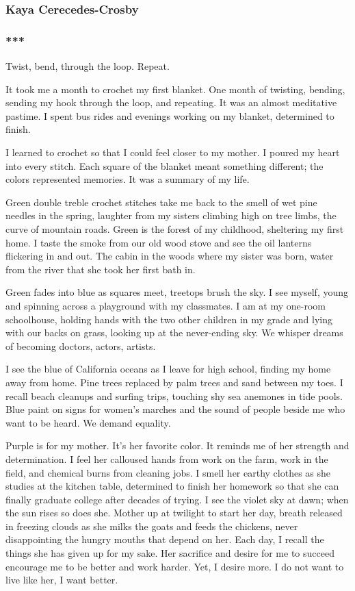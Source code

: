 \hypertarget{kaya-cerecedes-crosby}{%
\subsubsection{Kaya Cerecedes-Crosby}\label{kaya-cerecedes-crosby}}

\hypertarget{-3}{%
\subsubsection{***}\label{-3}}

Twist, bend, through the loop. Repeat.

It took me a month to crochet my first blanket. One month of twisting,
bending, sending my hook through the loop, and repeating. It was an
almost meditative pastime. I spent bus rides and evenings working on my
blanket, determined to finish.

I learned to crochet so that I could feel closer to my mother. I poured
my heart into every stitch. Each square of the blanket meant something
different; the colors represented memories. It was a summary of my life.

Green double treble crochet stitches take me back to the smell of wet
pine needles in the spring, laughter from my sisters climbing high on
tree limbs, the curve of mountain roads. Green is the forest of my
childhood, sheltering my first home. I taste the smoke from our old wood
stove and see the oil lanterns flickering in and out. The cabin in the
woods where my sister was born, water from the river that she took her
first bath in.

Green fades into blue as squares meet, treetops brush the sky. I see
myself, young and spinning across a playground with my classmates. I am
at my one-room schoolhouse, holding hands with the two other children in
my grade and lying with our backs on grass, looking up at the
never-ending sky. We whisper dreams of becoming doctors, actors,
artists.

I see the blue of California oceans as I leave for high school, finding
my home away from home. Pine trees replaced by palm trees and sand
between my toes. I recall beach cleanups and surfing trips, touching shy
sea anemones in tide pools. Blue paint on signs for women's marches and
the sound of people beside me who want to be heard. We demand equality.

Purple is for my mother. It's her favorite color. It reminds me of her
strength and determination. I feel her calloused hands from work on the
farm, work in the field, and chemical burns from cleaning jobs. I smell
her earthy clothes as she studies at the kitchen table, determined to
finish her homework so that she can finally graduate college after
decades of trying. I see the violet sky at dawn; when the sun rises so
does she. Mother up at twilight to start her day, breath released in
freezing clouds as she milks the goats and feeds the chickens, never
disappointing the hungry mouths that depend on her. Each day, I recall
the things she has given up for my sake. Her sacrifice and desire for me
to succeed encourage me to be better and work harder. Yet, I desire
more. I do not want to live like her, I want better.

